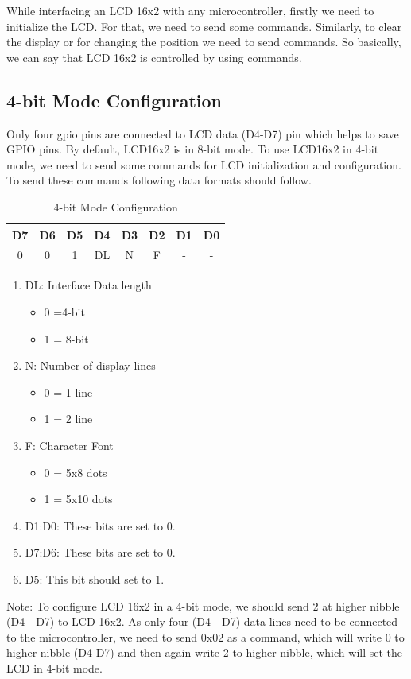 \documentclass[12pt, a4paper, twoside]{report}
\begin{document}
While interfacing an LCD 16x2 with any microcontroller, firstly we need to initialize the LCD. For that, we need to send some commands. Similarly, to clear the display or for changing the position we need to send commands. So basically, we can say that LCD 16x2 is controlled by using commands.
\subsection{4-bit Mode Configuration}
Only four \acrshort{gpio} pins are connected to LCD data (D4-D7) pin which helps to save GPIO pins. By default, LCD16x2 is in 8-bit mode. To use LCD16x2 in 4-bit mode, we need to send some commands for LCD initialization and configuration. To send these commands following data formats should follow.
\begin{table}[]
\centering
\begin{tabular}{|c|c|c|c|c|c|c|c|}
\hline
D7 & D6 & D5 & D4 & D3 & D2 & D1 & D0 \\ \hline
0  & 0  & 1  & DL & N  & F  & -  & -  \\ \hline
\end{tabular}
\caption{4-bit Mode Configuration}
\label{tab:4-bit-mode}
\end{table}

\begin{enumerate}[noitemsep]
\item DL: Interface Data length
	\begin{itemize}[noitemsep]
		\item 0 =4-bit
		\item 1 = 8-bit 
	\end{itemize}
\item N: Number of display lines
	\begin{itemize}[noitemsep]
		\item 0 = 1 line
		\item 1 = 2 line
	\end{itemize}
\item F: Character Font
	\begin{itemize}[noitemsep]
		\item 0 = 5x8 dots
		\item 1 = 5x10 dots
	\end{itemize}
\item D1:D0: These bits are set to 0.
\item D7:D6:  These bits are set to 0.
\item D5: This bit should set to 1.
\end{enumerate}
Note: To configure LCD 16x2 in a 4-bit mode, we should send 2 at higher nibble (D4 - D7) to LCD 16x2. As only four (D4 - D7) data lines need to be connected to the microcontroller, we need to send 0x02 as a command, which will write 0 to higher nibble (D4-D7) and then again write 2 to higher nibble, which will set the LCD in 4-bit mode.
\end{document}
